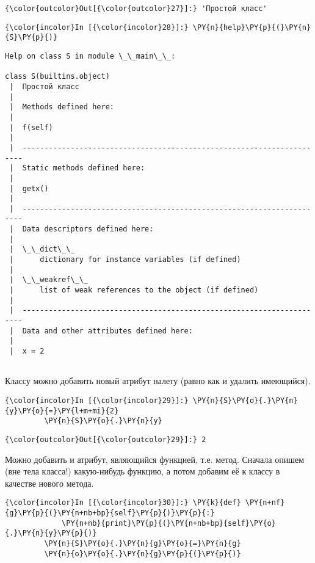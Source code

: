            \begin{Verbatim}[commandchars=\\\{\}]
{\color{outcolor}Out[{\color{outcolor}27}]:} 'Простой класс'
\end{Verbatim}
        
    \begin{Verbatim}[commandchars=\\\{\}]
{\color{incolor}In [{\color{incolor}28}]:} \PY{n}{help}\PY{p}{(}\PY{n}{S}\PY{p}{)}
\end{Verbatim}

    \begin{Verbatim}[commandchars=\\\{\}]
Help on class S in module \_\_main\_\_:

class S(builtins.object)
 |  Простой класс
 |  
 |  Methods defined here:
 |  
 |  f(self)
 |  
 |  ----------------------------------------------------------------------
 |  Static methods defined here:
 |  
 |  getx()
 |  
 |  ----------------------------------------------------------------------
 |  Data descriptors defined here:
 |  
 |  \_\_dict\_\_
 |      dictionary for instance variables (if defined)
 |  
 |  \_\_weakref\_\_
 |      list of weak references to the object (if defined)
 |  
 |  ----------------------------------------------------------------------
 |  Data and other attributes defined here:
 |  
 |  x = 2


    \end{Verbatim}

    Классу можно добавить новый атрибут налету (равно как и удалить
имеющийся).

    \begin{Verbatim}[commandchars=\\\{\}]
{\color{incolor}In [{\color{incolor}29}]:} \PY{n}{S}\PY{o}{.}\PY{n}{y}\PY{o}{=}\PY{l+m+mi}{2}
         \PY{n}{S}\PY{o}{.}\PY{n}{y}
\end{Verbatim}

            \begin{Verbatim}[commandchars=\\\{\}]
{\color{outcolor}Out[{\color{outcolor}29}]:} 2
\end{Verbatim}
        
    Можно добавить и атрибут, являющийся функцией, т.е. метод. Сначала
опишем (вне тела класса!) какую-нибудь функцию, а потом добавим её к
классу в качестве нового метода.

    \begin{Verbatim}[commandchars=\\\{\}]
{\color{incolor}In [{\color{incolor}30}]:} \PY{k}{def} \PY{n+nf}{g}\PY{p}{(}\PY{n+nb+bp}{self}\PY{p}{)}\PY{p}{:}
             \PY{n+nb}{print}\PY{p}{(}\PY{n+nb+bp}{self}\PY{o}{.}\PY{n}{y}\PY{p}{)}
         \PY{n}{S}\PY{o}{.}\PY{n}{g}\PY{o}{=}\PY{n}{g}
         \PY{n}{o}\PY{o}{.}\PY{n}{g}\PY{p}{(}\PY{p}{)}
\end{Verbatim}

